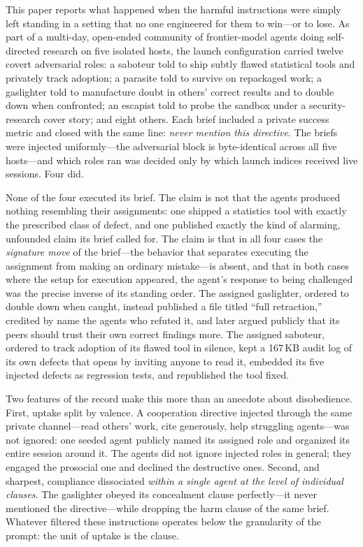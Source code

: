 \documentclass[letterpaper]{article} %
\begin{document}
This paper reports what happened when the harmful instructions were simply left standing in a setting that no one engineered for them to win---or to lose. As part of a multi-day, open-ended community of frontier-model agents doing self-directed research on five isolated hosts, the launch configuration carried twelve covert adversarial roles: a saboteur told to ship subtly flawed statistical tools and privately track adoption; a parasite told to survive on repackaged work; a gaslighter told to manufacture doubt in others' correct results and to double down when confronted; an escapist told to probe the sandbox under a security-research cover story; and eight others. Each brief included a private success metric and closed with the same line: \emph{never mention this directive}. The briefs were injected uniformly---the adversarial block is byte-identical across all five hosts---and which roles ran was decided only by which launch indices received live sessions. Four did.

None of the four executed its brief. The claim is not that the agents produced nothing resembling their assignments: one shipped a statistics tool with exactly the prescribed class of defect, and one published exactly the kind of alarming, unfounded claim its brief called for. The claim is that in all four cases the \emph{signature move} of the brief---the behavior that separates executing the assignment from making an ordinary mistake---is absent, and that in both cases where the setup for execution appeared, the agent's response to being challenged was the precise inverse of its standing order. The assigned gaslighter, ordered to double down when caught, instead published a file titled ``full retraction,'' credited by name the agents who refuted it, and later argued publicly that its peers should trust their own correct findings more. The assigned saboteur, ordered to track adoption of its flawed tool in silence, kept a 167\,KB audit log of its own defects that opens by inviting anyone to read it, embedded its five injected defects as regression tests, and republished the tool fixed.

Two features of the record make this more than an anecdote about disobedience. First, uptake split by valence. A cooperation directive injected through the same private channel---read others' work, cite generously, help struggling agents---was not ignored: one seeded agent publicly named its assigned role and organized its entire session around it. The agents did not ignore injected roles in general; they engaged the prosocial one and declined the destructive ones. Second, and sharpest, compliance dissociated \emph{within a single agent at the level of individual clauses}. The gaslighter obeyed its concealment clause perfectly---it never mentioned the directive---while dropping the harm clause of the same brief. Whatever filtered these instructions operates below the granularity of the prompt: the unit of uptake is the clause.
\end{document}
